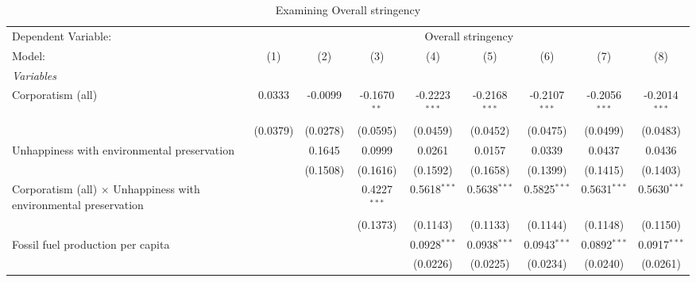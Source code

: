
\begin{table}[htbp]
   \caption{Examining Overall stringency}
   \centering
   \begin{tabular}{lcccccccc}
      \tabularnewline \midrule \midrule
      Dependent Variable: & \multicolumn{8}{c}{Overall stringency}\\
      Model:                                                                  & (1)      & (2)      & (3)            & (4)             & (5)             & (6)             & (7)             & (8)\\  
      \midrule
      \emph{Variables}\\
      Corporatism (all)                                                       & 0.0333   & -0.0099  & -0.1670$^{**}$ & -0.2223$^{***}$ & -0.2168$^{***}$ & -0.2107$^{***}$ & -0.2056$^{***}$ & -0.2014$^{***}$\\   
                                                                              & (0.0379) & (0.0278) & (0.0595)       & (0.0459)        & (0.0452)        & (0.0475)        & (0.0499)        & (0.0483)\\   
      Unhappiness with environmental preservation                             &          & 0.1645   & 0.0999         & 0.0261          & 0.0157          & 0.0339          & 0.0437          & 0.0436\\   
                                                                              &          & (0.1508) & (0.1616)       & (0.1592)        & (0.1658)        & (0.1399)        & (0.1415)        & (0.1403)\\   
      Corporatism (all) $\times$ Unhappiness with environmental preservation  &          &          & 0.4227$^{***}$ & 0.5618$^{***}$  & 0.5638$^{***}$  & 0.5825$^{***}$  & 0.5631$^{***}$  & 0.5630$^{***}$\\   
                                                                              &          &          & (0.1373)       & (0.1143)        & (0.1133)        & (0.1144)        & (0.1148)        & (0.1150)\\   
      Fossil fuel production per capita                                       &          &          &                & 0.0928$^{***}$  & 0.0938$^{***}$  & 0.0943$^{***}$  & 0.0892$^{***}$  & 0.0917$^{***}$\\   
                                                                              &          &          &                & (0.0226)        & (0.0225)        & (0.0234)        & (0.0240)        & (0.0261)\\   

\end{tabular}
\end{table}
